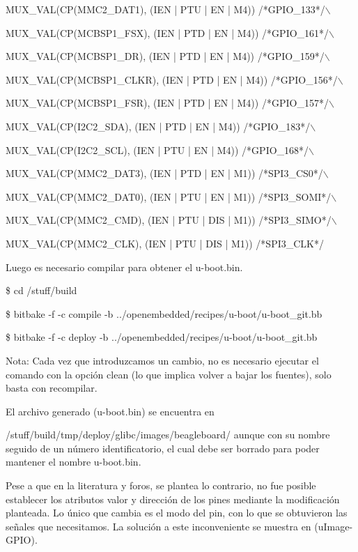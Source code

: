 MUX\_VAL(CP(MMC2\_DAT1),	(IEN  | PTU | EN  | M4)) /*GPIO\_133*/$\backslash$  

MUX\_VAL(CP(MCBSP1\_FSX),	(IEN  | PTD | EN  | M4)) /*GPIO\_161*/$\backslash$  

MUX\_VAL(CP(MCBSP1\_DR),	(IEN  | PTD | EN  | M4)) /*GPIO\_159*/$\backslash$  

MUX\_VAL(CP(MCBSP1\_CLKR),	(IEN  | PTD | EN  | M4)) /*GPIO\_156*/$\backslash$  

MUX\_VAL(CP(MCBSP1\_FSR),	(IEN  | PTD | EN  | M4)) /*GPIO\_157*/$\backslash$  

MUX\_VAL(CP(I2C2\_SDA),		(IEN  | PTD | EN  | M4)) /*GPIO\_183*/$\backslash$  

MUX\_VAL(CP(I2C2\_SCL),		(IEN  | PTU | EN  | M4)) /*GPIO\_168*/$\backslash$  

MUX\_VAL(CP(MMC2\_DAT3),	(IEN  | PTD | EN  | M1)) /*SPI3\_CS0*/$\backslash$  

MUX\_VAL(CP(MMC2\_DAT0),	(IEN  | PTU | EN  | M1)) /*SPI3\_SOMI*/$\backslash$  

MUX\_VAL(CP(MMC2\_CMD),		(IEN  | PTU | DIS | M1)) /*SPI3\_SIMO*/$\backslash$  

MUX\_VAL(CP(MMC2\_CLK),		(IEN  | PTU | DIS | M1)) /*SPI3\_CLK*/


Luego es necesario compilar para obtener el u-boot.bin.

\$ cd /stuff/build

\$ bitbake -f -c compile -b ../openembedded/recipes/u-boot/u-boot\_git.bb

\$ bitbake -f -c deploy -b ../openembedded/recipes/u-boot/u-boot\_git.bb


Nota: Cada vez que introduzcamos un cambio, no es necesario ejecutar el comando con la opción clean (lo que implica volver a bajar los fuentes), solo basta con recompilar.

El archivo generado (u-boot.bin) se encuentra en 

/stuff/build/tmp/deploy/glibc/images/beagleboard/ aunque con su nombre seguido de un número identificatorio, el cual debe ser borrado para poder mantener el nombre u-boot.bin.

Pese a que en la literatura y foros, se plantea lo contrario, no fue posible establecer los atributos valor y dirección de los pines mediante la modificación planteada. Lo único que cambia es el modo del pin, con lo que se obtuvieron las señales que necesitamos. La solución a este inconveniente se muestra en (uImage-GPIO).


